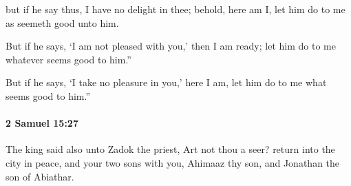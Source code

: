 			\begin{versebox}
					\item[BHS] 
					\item[ASV] but if he say thus, I have no delight in thee; behold, here am I, let him do to me as seemeth good unto him.
					\item[NIV] But if he says, ‘I am not pleased with you,’ then I am ready; let him do to me whatever seems good to him.”
					\item[NRSV] But if he says, ‘I take no pleasure in you,’ here I am, let him do to me what seems good to him.”
			\end{versebox}

		\paragraph{2 Samuel 15:27} %
			\label{2SAMUEL-15-27}

			The king said also unto Zadok the priest, Art not thou a seer? return into the city in peace, and your two sons with you, Ahimaaz thy son, and Jonathan the son of Abiathar.

